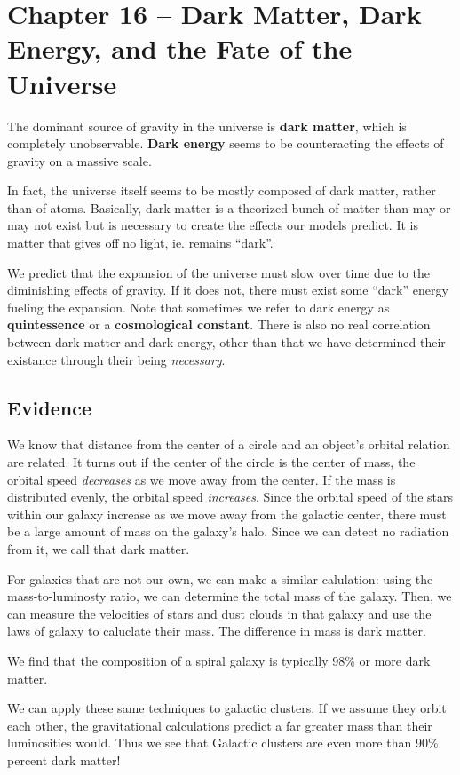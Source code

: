 \section{Chapter 16 -- Dark Matter, Dark Energy, and the Fate of the Universe}
The dominant source of gravity in the universe is {\bf dark matter}, which is completely unobservable. {\bf Dark energy} seems to be counteracting the effects of gravity on a massive scale.

In fact, the universe itself seems to be mostly composed of dark matter, rather than of atoms. Basically, dark matter is a theorized bunch of matter than may or may not exist but is necessary to create the effects our models predict. It is matter that gives off no light, ie. remains ``dark''.

We predict that the expansion of the universe must slow over time due to the diminishing effects of gravity. If it does not, there must exist some ``dark'' energy fueling the expansion. Note that sometimes we refer to dark energy as {\bf quintessence} or a {\bf cosmological constant}. There is also no real correlation between dark matter and dark energy, other than that we have determined their existance through their being {\it necessary}.

\subsection{Evidence}
We know that distance from the center of a circle and an object's orbital relation are related. It turns out if the center of the circle is the center of mass, the orbital speed {\it decreases} as we move away from the center. If the mass is distributed evenly, the orbital speed {\it increases}. Since the orbital speed of the stars within our galaxy increase as we move away from the galactic center, there must be a large amount of mass on the galaxy's halo. Since we can detect no radiation from it, we call that dark matter.

For galaxies that are not our own, we can make a similar calulation: using the mass-to-luminosty ratio, we can determine the total mass of the galaxy. Then, we can measure the velocities of stars and dust clouds in that galaxy and use the laws of galaxy to caluclate their mass. The difference in mass is dark matter.

We find that the composition of a spiral galaxy is typically 98\% or more dark matter.

We can apply these same techniques to galactic clusters. If we assume they orbit each other, the gravitational calculations predict a far greater mass than their luminosities would. Thus we see that Galactic clusters are even more than 90\% percent dark matter!


